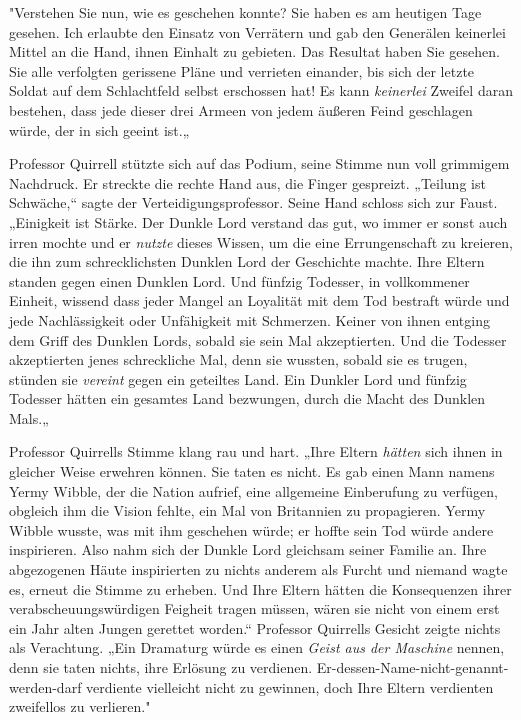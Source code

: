 {"Verstehen Sie nun, wie es geschehen konnte? Sie haben es am heutigen Tage gesehen. Ich erlaubte den Einsatz von Verrätern und gab den Generälen keinerlei Mittel an die Hand, ihnen Einhalt zu gebieten. Das Resultat haben Sie gesehen. Sie alle verfolgten gerissene Pläne und verrieten einander, bis sich der letzte Soldat auf dem Schlachtfeld selbst erschossen hat! Es kann \emph{keinerlei} Zweifel daran bestehen, dass jede dieser drei Armeen von jedem äußeren Feind geschlagen würde, der in sich geeint ist.„

Professor Quirrell stützte sich auf das Podium, seine Stimme nun voll grimmigem Nachdruck. Er streckte die rechte Hand aus, die Finger gespreizt. „Teilung ist Schwäche,“ sagte der Verteidigungsprofessor. Seine Hand schloss sich zur Faust. „Einigkeit ist Stärke. Der Dunkle Lord verstand das gut, wo immer er sonst auch irren mochte und er \emph{nutzte} dieses Wissen, um die eine Errungenschaft zu kreieren, die ihn zum schrecklichsten Dunklen Lord der Geschichte machte. Ihre Eltern standen gegen einen Dunklen Lord. Und fünfzig Todesser, in vollkommener Einheit, wissend dass jeder Mangel an Loyalität mit dem Tod bestraft würde und jede Nachlässigkeit oder Unfähigkeit mit Schmerzen. Keiner von ihnen entging dem Griff des Dunklen Lords, sobald sie sein Mal akzeptierten. Und die Todesser akzeptierten jenes schreckliche Mal, denn sie wussten, sobald sie es trugen, stünden sie \emph{vereint} gegen ein geteiltes Land. Ein Dunkler Lord und fünfzig Todesser hätten ein gesamtes Land bezwungen, durch die Macht des Dunklen Mals.„

Professor Quirrells Stimme klang rau und hart. „Ihre Eltern \emph{hätten} sich ihnen in gleicher Weise erwehren können. Sie taten es nicht. Es gab einen Mann namens Yermy Wibble, der die Nation aufrief, eine allgemeine Einberufung zu verfügen, obgleich ihm die Vision fehlte, ein Mal von Britannien zu propagieren. Yermy Wibble wusste, was mit ihm geschehen würde; er hoffte sein Tod würde andere inspirieren. Also nahm sich der Dunkle Lord gleichsam seiner Familie an. Ihre abgezogenen Häute inspirierten zu nichts anderem als Furcht und niemand wagte es, erneut die Stimme zu erheben. Und Ihre Eltern hätten die Konsequenzen ihrer verabscheuungswürdigen Feigheit tragen müssen, wären sie nicht von einem erst ein Jahr alten Jungen gerettet worden.“ Professor Quirrells Gesicht zeigte nichts als Verachtung. „Ein Dramaturg würde es einen \emph{Geist aus der Maschine} nennen, denn sie taten nichts, ihre Erlösung zu verdienen. Er-dessen-Name-nicht-genannt-werden-darf verdiente vielleicht nicht zu gewinnen, doch Ihre Eltern verdienten zweifellos zu verlieren."

}
